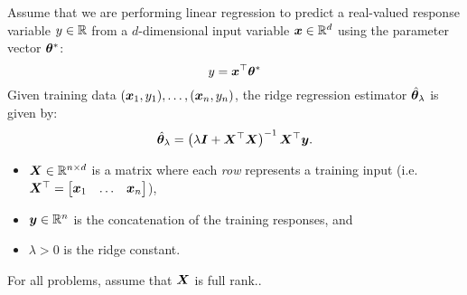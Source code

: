 \documentclass[11pt,letterpaper]{article}
\begin{document}
Assume that we are performing linear regression
to predict a real-valued response variable $y \in \mathbb{R}$ from
a $d$-dimensional input variable ${\bm{x}} \in \mathbb{R}^d$
using the parameter vector ${\bm{\theta}}^*$:
%
\[
  y = {\bm{x}}^\top {\bm{\theta}}^*
\]
%
Given training data $({\bm{x}}_1, y_1), \ldots, ({\bm{x}}_n, y_n)$,
the ridge regression estimator $\hat{{\bm{\theta}}}_\lambda$ is given by:
%
\begin{equation}
  \hat{{\bm{\theta}}}_\lambda = \left( \lambda {\bm{I}} + {\bm{X}}^\top {\bm{X}} \right)^{-1} {\bm{X}}^\top {\bm{y}}.
  \label{eqn:ridge_std}
\end{equation}
%
\begin{itemize}
  \item ${\bm{X}} \in \mathbb{R}^{n \times d}$ is a matrix where each \emph{row} represents a training input
    (i.e. ${\bm{X}}^\top = \begin{bmatrix} {\bm{x}}_1 & \ldots & {\bm{x}}_n \end{bmatrix}$),
  \item ${\bm{y}} \in \mathbb{R}^n$ is the concatenation of the training responses, and
  \item $\lambda > 0$ is the ridge constant.
\end{itemize}
%
For all problems, assume that ${\bm{X}}$ is full rank..
\end{document}
